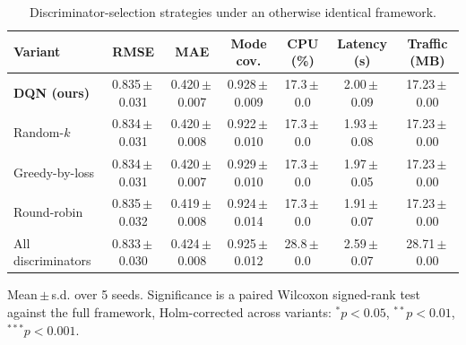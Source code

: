 \begin{table}[t]
\centering
\caption{Discriminator-selection strategies under an otherwise identical framework.}
\label{tab:selection}
\begin{tabular}{lcccccc}
\toprule
Variant & RMSE & MAE & Mode cov. & CPU (\%) & Latency (s) & Traffic (MB) \\
\midrule
\textbf{DQN (ours)} & 0.835\,$\pm$\,0.031 & 0.420\,$\pm$\,0.007 & 0.928\,$\pm$\,0.009 & 17.3\,$\pm$\,0.0 & 2.00\,$\pm$\,0.09 & 17.23\,$\pm$\,0.00 \\
Random-$k$ & 0.834\,$\pm$\,0.031 & 0.420\,$\pm$\,0.008 & 0.922\,$\pm$\,0.010 & 17.3\,$\pm$\,0.0 & 1.93\,$\pm$\,0.08 & 17.23\,$\pm$\,0.00 \\
Greedy-by-loss & 0.834\,$\pm$\,0.031 & 0.420\,$\pm$\,0.007 & 0.929\,$\pm$\,0.010 & 17.3\,$\pm$\,0.0 & 1.97\,$\pm$\,0.05 & 17.23\,$\pm$\,0.00 \\
Round-robin & 0.835\,$\pm$\,0.032 & 0.419\,$\pm$\,0.008 & 0.924\,$\pm$\,0.014 & 17.3\,$\pm$\,0.0 & 1.91\,$\pm$\,0.07 & 17.23\,$\pm$\,0.00 \\
All discriminators & 0.833\,$\pm$\,0.030 & 0.424\,$\pm$\,0.008 & 0.925\,$\pm$\,0.012 & 28.8\,$\pm$\,0.0 & 2.59\,$\pm$\,0.07 & 28.71\,$\pm$\,0.00 \\
\bottomrule
\end{tabular}
\begin{flushleft}\footnotesize
Mean\,$\pm$\,s.d. over 5 seeds. Significance is a paired Wilcoxon signed-rank test against the full framework, Holm-corrected across variants: $^{*}p<0.05$, $^{**}p<0.01$, $^{***}p<0.001$.
\end{flushleft}
\end{table}
